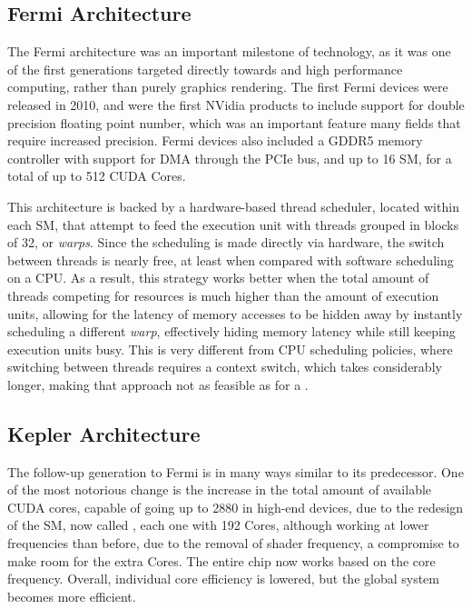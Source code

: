 \documentclass[main.tex]{subfiles}
\begin{document}
\subsection{Fermi Architecture}

The Fermi architecture was an important milestone of \gpus technology, as it was one of the first generations targeted directly towards \gpgpu and high performance computing, rather than purely graphics rendering. The first Fermi devices were released in 2010, and were the first NVidia products to include support for double precision floating point number, which was an important feature many fields that require increased precision. Fermi devices also included a GDDR5 memory controller with support for \ac{DMA} through the \acs{PCIe} bus, and up to 16 \acf{SM}, for a total of up to 512 \acs{CUDA} Cores.


This architecture is backed by a hardware-based thread scheduler, located within each \acs{SM}, that attempt to feed the execution unit with threads grouped in blocks of 32, or \textit{warps}. Since the scheduling is made directly via hardware, the switch between threads is nearly free, at least when compared with software scheduling on a \acs{CPU}. As a result, this strategy works better when the total amount of threads competing for resources is much higher than the amount of execution units, allowing for the latency of memory accesses to be hidden away by instantly scheduling a different \textit{warp}, effectively hiding memory latency while still keeping execution units busy. This is very different from \acs{CPU} scheduling policies, where switching between threads requires a context switch, which takes considerably longer, making that approach not as feasible as for a \gpu.



\subsection{Kepler Architecture}

The follow-up generation to Fermi is in many ways similar to its predecessor. One of the most notorious change is the increase in the total amount of available CUDA cores, capable of going up to 2880 in high-end devices, due to the redesign of the \acl{SM}, now called \smx, each one with 192 \cuda Cores, although working at lower frequencies than before, due to the removal of shader frequency, a compromise to make room for the extra \cuda Cores. The entire chip now works based on the core frequency. Overall, individual core efficiency is lowered, but the global system becomes more efficient.
\end{document}
